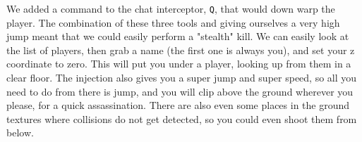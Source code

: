 \documentclass[11pt]{article}
\begin{document}
We added a command to the chat interceptor, \texttt{Q}, that would down warp the player. The combination of these three tools and giving ourselves a very high jump meant that we could easily perform a "stealth" kill. We can easily look at the list of players, then grab a name (the first one is always you), and set your z coordinate to zero. This will put you under a player, looking up from them in a clear floor. The injection also gives you a super jump and super speed, so all you need to do from there is jump, and you will clip above the ground wherever you please, for a quick assassination. There are also even some places in the ground textures where collisions do not get detected, so you could even shoot them from below.
\end{document}
